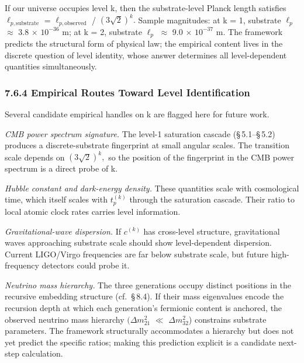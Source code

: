 \documentclass[11pt,oneside]{report}
\theoremstyle{definition}
\theoremstyle{remark}
\begin{document}
If our universe occupies level k, then the substrate-level Planck length
satisfies \ensuremath{\ell_{p,\mathrm{substrate}}} = \ensuremath{\ell_{p,\mathrm{observed}}} / \ensuremath{(3\sqrt{2})^{k}.} Sample magnitudes:
at k = 1, substrate \ensuremath{\ell_{p}} \ensuremath{\approx} 3.8 \ensuremath{\times} \ensuremath{10^{-36}} m; at k = 2, substrate \ensuremath{\ell_{p}} \ensuremath{\approx} 9.0 \ensuremath{\times}
\ensuremath{10^{-37}} m. The framework predicts the structural form of physical law; the
empirical content lives in the discrete question of level identity,
whose answer determines all level-dependent quantities simultaneously.

\subsubsection*{7.6.4 Empirical Routes Toward Level Identification}

Several candidate empirical handles on k are flagged here for future
work.

\emph{CMB power spectrum signature.} The level-1 saturation cascade
(\S\,5.1--\S\,5.2) produces a discrete-substrate fingerprint at small angular
scales. The transition scale depends on \ensuremath{(3\sqrt{2})^{k},} so the position of
the fingerprint in the CMB power spectrum is a direct probe of k.

\emph{Hubble constant and dark-energy density.} These quantities scale
with cosmological time, which itself scales with \ensuremath{t_{p}^{(k)}} through the
saturation cascade. Their ratio to local atomic clock rates carries
level information.

\emph{Gravitational-wave dispersion.} If \ensuremath{c^{(k)}} has cross-level
structure, gravitational waves approaching substrate scale should show
level-dependent dispersion. Current LIGO/Virgo frequencies are far below
substrate scale, but future high-frequency detectors could probe it.

\emph{Neutrino mass hierarchy.} The three generations occupy distinct
positions in the recursive embedding structure (cf.~\S\,8.4). If their mass
eigenvalues encode the recursion depth at which each generation's
fermionic content is anchored, the observed neutrino mass hierarchy
\ensuremath{(\Delta m^{2}_{21}} \ensuremath{\ll} \textbar \ensuremath{\Delta m^{2}_{32}}\textbar) constrains substrate parameters. The
framework structurally accommodates a hierarchy but does not yet predict
the specific ratios; making this prediction explicit is a candidate
next-step calculation.
\end{document}
